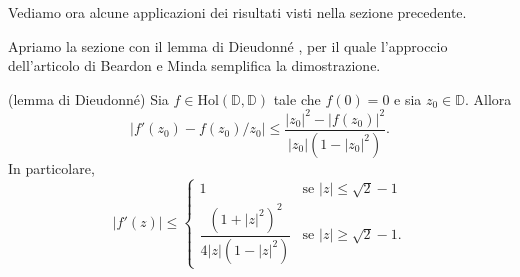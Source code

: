 Vediamo ora alcune applicazioni dei risultati visti nella sezione precedente.

Apriamo la sezione con il lemma di Dieudonné \cite[Chapitre III, paragraphe 8, équation (25)]{D}, per il quale l'approccio dell'articolo di Beardon e Minda semplifica la dimostrazione.

\begin{lm}
  (lemma di Dieudonné) Sia $f \in \text{Hol}(\mathbb{D},\mathbb{D})$ tale che $f(0)=0$ e sia $z_0 \in \mathbb{D}$. Allora
  \begin{equation} \label{dieu}
    |f'(z_0)-f(z_0)/z_0| \le \frac{|z_0|^2-|f(z_0)|^2}{|z_0|(1-|z_0|^2)}.
  \end{equation}
  In particolare,
  \begin{equation} \label{dieuprimo}
    |f'(z)| \le \begin{cases}
      1 & \mbox{se } |z| \le \sqrt{2}-1 \\
      \dfrac{(1+|z|^2)^2}{4|z|(1-|z|^2)} & \mbox{se } |z| \ge \sqrt{2}-1.
  \end{cases}
  \end{equation}
\end{lm}

